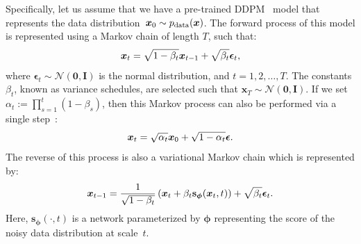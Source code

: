 \documentclass[conference]{IEEEtran}
\theoremstyle{definition}
\theoremstyle{remark}
\theoremstyle{proposition}
\begin{document}
Specifically, let us assume that we have a pre-trained DDPM~\citep{ho2020ddpm} model that represents the data distribution~$\boldsymbol{x}_0 \sim p_{\rm data}(\boldsymbol{x})$.
The forward process of this model is represented using a Markov chain of length $T$, such that:
\begin{equation}\label{eq:forward_process}
    \small
    \boldsymbol{x}_{t} = \sqrt{1 - \beta_{t}} \boldsymbol{x}_{t-1} + \sqrt{\beta_{t}} \boldsymbol{\epsilon}_{t},
\end{equation}
where $\boldsymbol{\epsilon}_{t} \sim \mathcal{N}(\boldsymbol{0}, \mathbf{I})$ is the normal distribution, and ${t=1, 2, \dots, T}$. 
The constants $\beta_{t}$, known as variance schedules, are selected such that $\boldsymbol{x}_{T} \sim \mathcal{N}(\boldsymbol{0}, \mathbf{I})$.
If we set ${\alpha_{t}:=\prod_{s=1}^t\left(1-\beta_{s}\right)}$, then this Markov process can also be performed via a single step~\citep{ho2020ddpm}:
\begin{equation}\label{eq:forward_process_2}
    \small
    \boldsymbol{x}_{t} =  \sqrt{\alpha_{t}} \boldsymbol{x}_{0} + \sqrt{1 - \alpha_{t}} \boldsymbol{\epsilon}.
\end{equation}
The reverse of this process is also a variational Markov chain which is represented by:
\begin{equation}\label{eq:reverse_process}
    \small
    \boldsymbol{x}_{t-1}=\frac{1}{\sqrt{1-\beta_{t}}}\left(\boldsymbol{x}_{t}+\beta_{t} \mathbf{s}_{\boldsymbol{\phi}}(\boldsymbol{x}_{t}, t)\right)+\sqrt{\beta_{t}} \boldsymbol{\epsilon}_{t}.
\end{equation}
Here, $\mathbf{s}_{\boldsymbol{\phi}}(\cdot, t)$ is a network parameterized by $\boldsymbol{\phi}$ representing the score of the noisy data distribution at scale~$t$.
\end{document}
